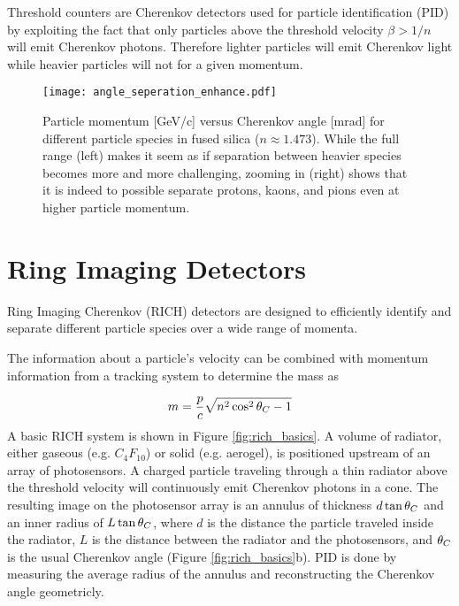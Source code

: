 Threshold counters are Cherenkov detectors used for particle identification (PID) by exploiting the fact that only particles above the threshold velocity $\beta > 1/n$ will emit Cherenkov photons. Therefore lighter particles will emit Cherenkov light while heavier particles will not for a given momentum.

\begin{figure}[!htb]
	\centering
	\texttt{[image: angle\_seperation\_enhance.pdf]}
	\caption{Particle momentum [GeV/c] versus Cherenkov angle [mrad] for different particle species in fused silica ($n \approx 1.473$). While the full range (left) makes it seem as if separation between heavier species becomes more and more challenging, zooming in (right) shows that it is indeed to possible separate protons, kaons, and pions even at higher particle momentum.}
	\label{fig:angleseperation}
\end{figure}

\section{Ring Imaging Detectors}
Ring Imaging Cherenkov (RICH) detectors are designed to efficiently identify and separate different particle species over a wide range of momenta.

The information about a particle's velocity can be combined with momentum information from a tracking system to determine the mass as \cite{ParticleDetectionHandbook}

\begin{equation}
	m = \frac{p}{c} \sqrt{n^2 \cos^2\theta_{C} - 1}
	\label{eq:mass}
\end{equation}
%
A basic RICH system is shown in Figure \ref{fig:rich_basics}. A volume of radiator, either gaseous (e.g. $C_{4}F_{10}$) or solid (e.g. aerogel), is positioned upstream of an array of photosensors. A charged particle traveling through a thin radiator above the threshold velocity will continuously emit Cherenkov photons in a cone. The resulting image on the photosensor array is an annulus of thickness $d\tan\theta_{C}$ and an inner radius of $L\tan\theta_{C}$, where $d$ is the distance the particle traveled inside the radiator, $L$ is the distance between the radiator and the photosensors, and  $\theta_{C}$ is the usual Cherenkov angle (Figure \ref{fig:rich_basics}b). PID is done by measuring the average radius of the annulus and reconstructing the Cherenkov angle geometricly.


